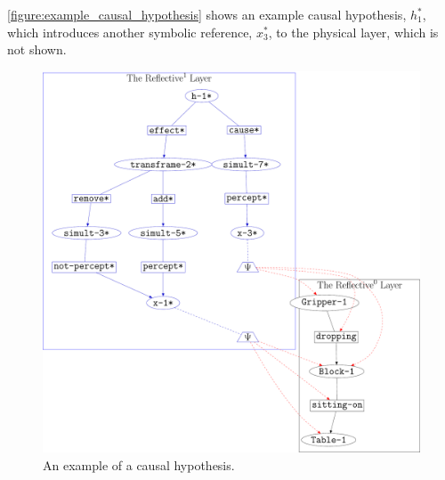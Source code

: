 {\mbox{\autoref{figure:example_causal_hypothesis}}} shows an example
causal hypothesis, $h_1^*$, which introduces another symbolic
reference, $x_3^*$, to the physical layer, which is not shown.
\begin{figure}
\center
\includegraphics[width=12cm]{gfx/example_causal_hypothesis}
\caption{An example of a causal hypothesis.}
\label{figure:example_causal_hypothesis}
\end{figure}

